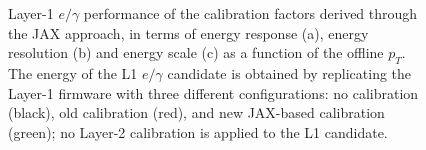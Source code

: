 \begin{figure}
    \centering
    
    \caption{Layer-1 $e/\gamma$ performance of the calibration factors derived through the JAX approach, in terms of energy response (a), energy resolution (b) and energy scale (c) as a function of the offline $p_T$. The energy of the L1 $e/\gamma$ candidate is obtained by replicating the Layer-1 firmware with three different configurations: no calibration (black), old calibration (red), and new JAX-based calibration (green); no Layer-2 calibration is applied to the L1 candidate.
}
    \label{fig:JAX_ECAL_Response}
\end{figure}

